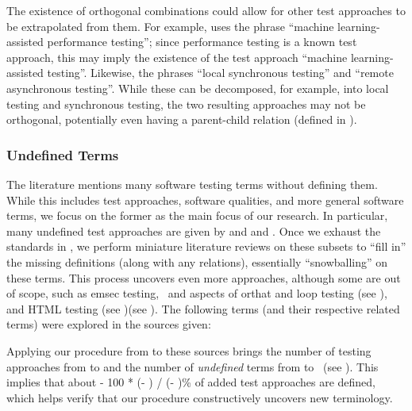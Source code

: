     The existence of orthogonal combinations could allow for other test
    approaches to be extrapolated from them. For example, \citet{Moghadam2019}
    uses the phrase ``machine learning-assisted performance testing''; since
    performance testing is a known test approach, this may imply the existence
    of the test approach ``machine learning-assisted testing''. Likewise,
    \citet{JardEtAl1999}  the phrases ``local synchronous
    testing'' and ``remote asynchronous testing''. While these can be
    decomposed, for example, into local testing and synchronous testing,
    the two resulting approaches may not be orthogonal, potentially even having
    a parent-child relation (defined in ).
\fi

\subsubsection{Undefined Terms}
\label{undef-terms}

The literature mentions many software testing terms without defining them.
While this includes test approaches, software qualities, and more general
software terms, we focus on the former as the main focus of our research.
In particular, many undefined test approaches are given by \ifnotpaper
    \citep{IEEE2022} and \citep{Firesmith2015}\else
    \cite{Firesmith2015} and \cite{IEEE2022}\fi. Once we exhaust the standards
in , we
perform miniature literature reviews on these subsets to ``fill in'' the
missing definitions (along with any relations), essentially ``snowballing''
on these terms. This process uncovers even more approaches, although some are
out of scope, such as \acf{emsec} testing\ifnotpaper, \else\ and \fi
aspects of \acf{orthat} \ifnotpaper and loop testing (see ),
    and HTML testing (see )\else (see )\fi. The
following terms (and their respective related terms) were explored in the
sources given:

Applying our procedure from  to these sources brings the number
of testing approaches from \the\TotalBefore{} to \the\TotalAfter{} and the
number of \emph{undefined} terms from \the\UndefBefore{} to \the\UndefAfter{}%
\ifnotpaper\ (see )\fi. This implies that about
\the{} - 100 * (\UndefAfter - \UndefBefore) / (\TotalAfter -
\TotalBefore)\relax\% of added test approaches are defined, which helps verify
that our procedure constructively uncovers new terminology.

